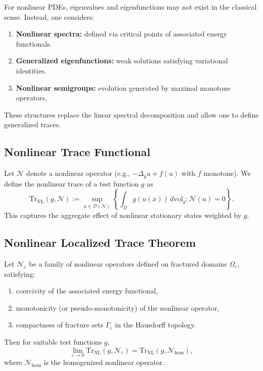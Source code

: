 For nonlinear PDEs, eigenvalues and eigenfunctions may not exist in the classical sense. Instead, one considers:

\begin{enumerate}[label=(\alph*)]
  \item \textbf{Nonlinear spectra:} defined via critical points of associated energy functionals.
  \item \textbf{Generalized eigenfunctions:} weak solutions satisfying variational identities.
  \item \textbf{Nonlinear semigroups:} evolution generated by maximal monotone operators.
\end{enumerate}

These structures replace the linear spectral decomposition and allow one to define generalized traces.

\subsection{Nonlinear Trace Functional}

Let $\mathcal{N}$ denote a nonlinear operator (e.g., $-\Delta_g u + f(u)$ with $f$ monotone).  
We define the nonlinear trace of a test function $g$ as
\[
\mathrm{Tr}_{\mathrm{NL}}(g, \mathcal{N}) := \sup_{u \in \mathcal{D}(\mathcal{N})} 
\left\{ \int_\Omega g(u(x)) \, d\mathrm{vol}_g : \mathcal{N}(u) = 0 \right\}.
\]
This captures the aggregate effect of nonlinear stationary states weighted by $g$.

\subsection{Nonlinear Localized Trace Theorem}

\begin{theorem}
\label{thm:nonlinear-trace}
Let $\mathcal{N}_\varepsilon$ be a family of nonlinear operators defined on fractured domains $\Omega_\varepsilon$, satisfying:
\begin{enumerate}[label=(\roman*)]
  \item coercivity of the associated energy functional,
  \item monotonicity (or pseudo-monotonicity) of the nonlinear operator,
  \item compactness of fracture sets $\Gamma_\varepsilon$ in the Hausdorff topology.
\end{enumerate}
Then for suitable test functions $g$,
\[
\lim_{\varepsilon \to 0} \mathrm{Tr}_{\mathrm{NL}}(g, \mathcal{N}_\varepsilon)
= \mathrm{Tr}_{\mathrm{NL}}(g, \mathcal{N}_{\mathrm{hom}}),
\]
where $\mathcal{N}_{\mathrm{hom}}$ is the homogenized nonlinear operator.
\end{theorem}

